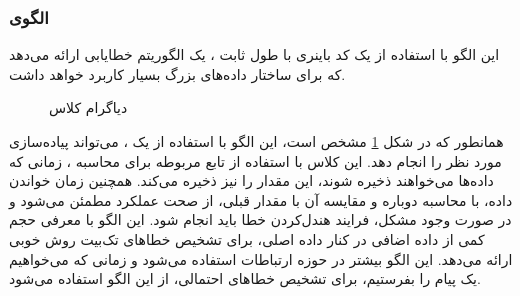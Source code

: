 \subsubsection{الگوی }
\label{safeCRCSec}
\begin{RTL}
این الگو \cite{ref1} با استفاده از یک کد باینری با طول ثابت ،
یک الگوریتم خطایابی ارائه می‌دهد که برای ساختار داده‌های
بزرگ بسیار کاربرد خواهد داشت.
\end{RTL}
\begin{figure}[h!]
\centering
{}
\caption{دیاگرام کلاس }
\label{safeCRCClassDiag}
\end{figure}
\begin{RTL}
همانطور که در شکل \ref{safeCRCClassDiag} مشخص
است، این الگو با استفاده از یک ، می‌تواند
پیاده‌سازی مورد نظر را انجام دهد. این کلاس با استفاده از تابع مربوطه برای محاسبه
، زمانی که داده‌ها می‌خواهند ذخیره شوند، این مقدار را نیز
ذخیره می‌کند. همچنین زمان خواندن داده، با محاسبه دوباره  و
مقایسه آن با مقدار قبلی، از صحت عملکرد مطمئن می‌شود و در صورت وجود مشکل،
فرایند هندل‌کردن خطا باید انجام شود.
این الگو با معرفی حجم کمی از داده اضافی در کنار داده اصلی، برای
تشخیص خطاهای تک‌بیت روش خوبی ارائه می‌دهد. این الگو بیشتر در حوزه
ارتباطات استفاده می‌شود و زمانی که می‌خواهیم یک پیام را بفرستیم، برای تشخیص
خطاهای احتمالی، از این الگو استفاده می‌شود.
\end{RTL}